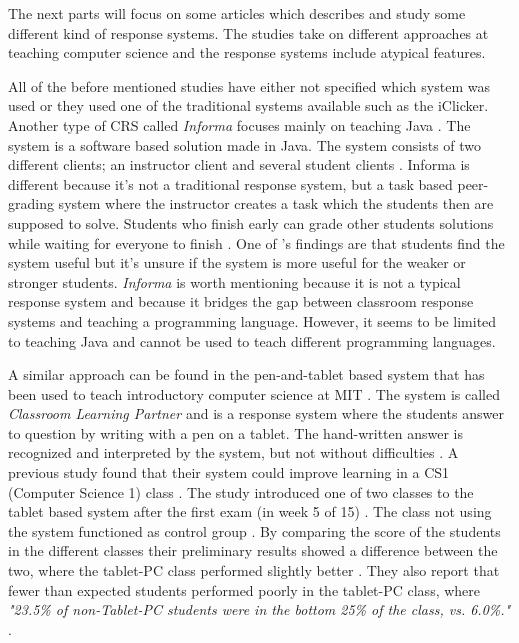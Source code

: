The next parts will focus on some articles which describes and study some different kind of response systems. The studies take on different approaches at teaching computer science and the response systems include atypical features.

All of the before mentioned studies have either not specified which system was used or they used one of the traditional systems available such as the iClicker. Another type of CRS called \emph{Informa} focuses mainly on teaching Java \cite{Hauswirth09}. The system is a software based solution made in Java. The system consists of two different clients; an instructor client and several student clients \cite[p.~1]{Hauswirth09}. Informa is different because it's not a traditional response system, but a task based peer-grading system where the instructor creates a task which the students then are supposed to solve. Students who finish early can grade other students solutions while waiting for everyone to finish \cite{Hauswirth09}. One of 's findings are that students find the system useful but it's unsure if the system is more useful for the weaker or stronger students. \emph{Informa} is worth mentioning because it is not a typical response system and because it bridges the gap between classroom response systems and teaching a programming language. However, it seems to be limited to teaching Java and cannot be used to teach different programming languages.

A similar approach can be found in the pen-and-tablet based system that has been used to teach introductory computer science at MIT \cite{koile2007supporting}. The system is called \emph{Classroom Learning Partner} and is a response system where the students answer to question by writing with a pen on a tablet. The hand-written answer is recognized and interpreted by the system, but not without difficulties \cite[pp.~2-3]{koile2007supporting}. A previous study found that their system could improve learning in a CS1 (Computer Science 1) class \cite{koile2006improving}. The study introduced one of two classes to the tablet based system after the first exam (in week 5 of 15) \cite[pp.~6-7]{koile2006improving}. The class not using the system functioned as control group \cite[pp.~6-7]{koile2006improving}. By comparing the score of the students in the different classes their preliminary results showed a difference between the two, where the tablet-PC class performed slightly better \cite{koile2006improving}. They also report that fewer than expected students performed poorly in the tablet-PC class, where \emph{"23.5\% of non-Tablet-PC students were in the bottom 25\% of the class, vs. 6.0\%."} \cite[p.~7]{koile2006improving}. %

